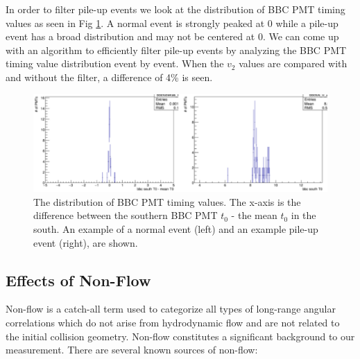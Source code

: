 In order to filter pile-up events we look at the distribution of BBC PMT timing values as seen in Fig \ref{fig:pile_up_example}. A normal event is strongly peaked at 0 while a pile-up event has a broad distribution and may not be centered at 0. We can come up with an algorithm to efficiently filter pile-up events by analyzing the BBC PMT timing value distribution event by event. When the $v_2$ values are compared with and without the filter, a difference of 4\% is seen.

\begin{figure}[!h]
\begin{center}
\includegraphics[width=0.8\linewidth]{figs/example_pile_up_event.png}
\caption{The distribution of BBC PMT timing values. The x-axis is the difference between the southern BBC PMT $t_0$ - the mean $t_0$ in the south. An example of a normal event (left) and an example pile-up event (right), are shown.}
\label{fig:pile_up_example}
\end{center}
\end{figure}

\subsection{Effects of Non-Flow}
\label{sec:non_flow_intro}
Non-flow is a catch-all term used to categorize all types of long-range angular correlations which do not arise from hydrodynamic flow and are not related to the initial collision geometry. Non-flow constitutes a significant background to our measurement. There are several known sources of non-flow:

